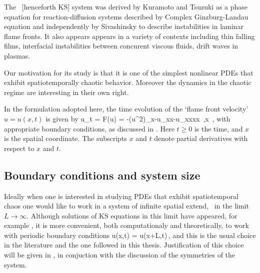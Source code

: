  
The \KS\ [henceforth KS] system was derived by Kuramoto and Tsuzuki as a phase equation for reaction-diffusion
systems described by Complex Ginzburg-Landau equation and independently by Sivashinsky to describe instabilities in laminar flame fronts.
It also appears appears in a variety of contexts including thin falling films, interfacial instabilities between concurent viscous fluids, drift waves in plasmas. 

Our motivation for its study is that it is one of the simplest nonlinear PDEs that
exhibit spatiotemporally chaotic behavior. Moreover the dynamics in the chaotic regime are
interesting in their own right.

 In the formulation
adopted here, the time evolution of the `flame front velocity'
$u=u(x,t)$ %
is given by
\beq
  u_t = F(u) = -{\textstyle{}}(u^2)_x-u_{xx}-u_{xxxx}
    \,,\qquad   x \in [-L/2,L/2]
    \,,
with appropriate boundary conditions, as discussed in .
Here $t \geq 0$ is the time, and $x$ is the spatial coordinate.
The subscripts $x$ and $t$ denote partial derivatives with respect to
$x$ and $t$. 

\subsection{Boundary conditions and system size}
\label{sec:KSbc}

Ideally when one is interested in studying PDEs that exhibit spatiotemporal chaos one
would like to work in a system of infinite spatial extend, \ie\ in the limit $L\rightarrow\infty$. 
Although solutions of KS equations in this limit have appeared, \cf for example , it is
more convenient, both computationaly and theoretically, to work with periodic boundary conditions
\beq
  u(x,t) = u(x+L,t)\,,
 \label{eq:KSper}
\eeq
and this is the usual choice in the literature and the one followed in this thesis. 
Justification of this choice will be given
in , in conjuction with the discussion of the symmetries of the system.

